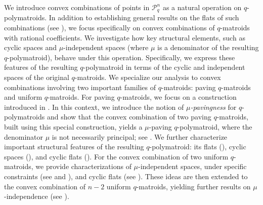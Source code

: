 \documentclass[a4paper,11pt,reqno]{amsart}
\theoremstyle{definition}
\begin{document}
We introduce convex combinations of points in $\mathcal{P}_q^n$ as a natural operation on $q$-polymatroids. In addition to establishing general results on the flats of such combinations (see ), we focus specifically on convex combinations of $q$-matroids with rational coefficients. We investigate how key structural elements, such as cyclic spaces and $\mu$-independent spaces (where $\mu$ is a denominator of the resulting $q$-polymatroid), behave under this operation. Specifically, we express these features of the resulting $q$-polymatroid in terms of the cyclic and independent spaces of the original $q$-matroids. We specialize our analysis to convex combinations involving two important families of $q$-matroids: paving $q$-matroids and uniform $q$-matroids. For paving $q$-matroids, we focus on a construction introduced in \cite{gluesing2022q}. In this context, we introduce the notion of \emph{$\mu$-pavingness} for $q$-polymatroids and show that the convex combination of two paving $q$-matroids, built using this special construction, yields a $\mu$-paving $q$-polymatroid, where the denominator $\mu$ is not necessarily principal; see . We further characterize important structural features of the resulting $q$-polymatroid: its flats (), cyclic spaces (), and cyclic flats (). For the convex combination of two uniform $q$-matroids, we provide characterizations of $\mu$-independent spaces, under specific constraints (see  and ), and cyclic flats (see ). These ideas are then extended to the convex combination of $n-2$ uniform $q$-matroids, yielding further results on $\mu$-independence (see ).
\end{document}
